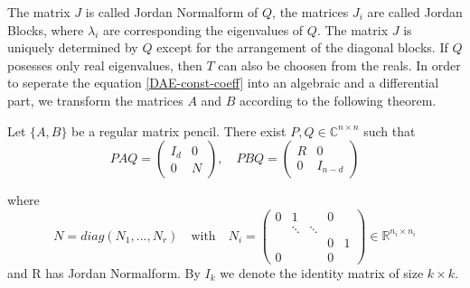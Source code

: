 The matrix $J$ is called Jordan Normalform of $Q$, the matrices $J_i$ are called Jordan Blocks, where $\lambda_i$ are corresponding the eigenvalues of $Q$. The matrix $J$ is uniquely determined by $Q$ except for the arrangement of the diagonal blocks. If $Q$ posesses only real eigenvalues, then $T$ can also be choosen from the reals. \newline
In order to seperate the equation \eqref{DAE-const-coeff} into an algebraic and a differential part, we transform the matrices $A$ and $B$ according to the following theorem.
\begin{theorem}
	\label{Kronecker-Normalform}
	Let $\{ A,B \}$ be a regular matrix pencil. There exist $P,Q \in \mathbb{C}^{n \times n}$ such that
	\begin{displaymath}
		PAQ = 
		\left(
		\begin{matrix}
			I_d & 0 \\
			0 & N 
		\end{matrix}
		\right), \quad
		PBQ = 
		\left(
		\begin{matrix}
			R & 0 \\
			0 & I_{n-d}
		\end{matrix}
		\right)
	\end{displaymath}

	where
	\begin{displaymath}
		N = diag(N_1, ..., N_r) \quad \text{with} \quad N_i = 
		\left(
		\begin{matrix}
			0 & 1 & & 0\\
			& \ddots &\ddots & \\
			& & & 0 & 1 \\
			0 & & & 0
		\end{matrix}
		\right)
		\in \mathbb{R}^{n_i \times n_i}
	\end{displaymath}
	and R has Jordan Normalform. By $I_k$ we denote the identity matrix of size $k \times k$.
\end{theorem}

